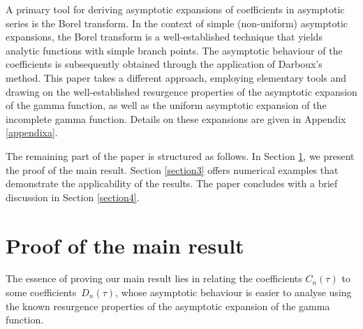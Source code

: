 A primary tool for deriving asymptotic expansions of coefficients in asymptotic series is the Borel transform. In the context of simple (non-uniform) asymptotic expansions, the Borel transform is a well-established technique that yields analytic functions with simple branch points. The asymptotic behaviour of the coefficients is subsequently obtained through the application of Darboux's method. This paper takes a different approach, employing elementary tools and drawing on the well-established resurgence properties of the asymptotic expansion of the gamma function, as well as the uniform asymptotic expansion of the incomplete gamma function. Details on these expansions are given in Appendix \ref{appendixa}.

The remaining part of the paper is structured as follows. In Section \ref{section2}, we present the proof of the main result. Section \ref{section3} offers numerical examples that demonstrate the applicability of the results. The paper concludes with a brief discussion in Section \ref{section4}.

\section{Proof of the main result}\label{section2}

The essence of proving our main result lies in relating the coefficients $C_n(\tau)$ to some coefficients~$D_n(\tau)$, whose asymptotic behaviour is easier to analyse using the known resurgence properties of the asymptotic expansion of the gamma function.


